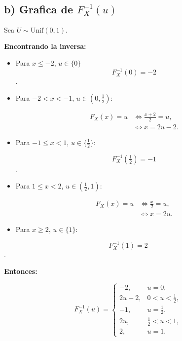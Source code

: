 \documentclass[10pt,a4paper]{article}
\begin{document}
    \begin{center}
    \end{center}
    { \hspace*{\fill} \\}
    
    \hypertarget{b-grafica-de-f_x-1u}{%
\subsection{\texorpdfstring{b) Grafica de
\(F_{X}^{-1}(u)\)}{b) Grafica de F\_\{X\}\^{}\{-1\}(u)}}\label{b-grafica-de-f_x-1u}}

    Sea \textbf{\(U\sim\mathrm{Unif}(0,1)\)}.

\textbf{Encontrando la inversa:}

\begin{itemize}
\item
  Para \(x\le -2\), \(u\in\{0\}\) \[
  F_X^{-1}(0)=-2
  \].
\item
  Para \(-2<x<-1\), \(u\in(0,\tfrac12)\):

  \[
  \begin{aligned}
  F_X(x)=u &\iff \frac{x+2}{2}=u,\\
           &\iff x=2u-2.
  \end{aligned}
  \]
\item
  Para \(-1\le x<1\), \(u\in\{\tfrac12\}\):

  \[
  F_X^{-1}(\tfrac12)=-1
  \].
\item
  Para \(1\le x<2\), \(u\in(\tfrac12,1)\):

  \[
  \begin{aligned}
  F_X(x)=u &\iff \frac{x}{2}=u,\\
           &\iff x=2u.
  \end{aligned}
  \]
\item
  Para \(x\ge 2\), \(u\in\{1\}\):
\end{itemize}

\[
F_X^{-1}(1)=2
\].

\textbf{Entonces:}

\[
F_X^{-1}(u)=
\begin{cases}
-2,& u=0,\\[4pt]
2u-2,& 0<u<\tfrac12,\\[4pt]
-1,& u=\tfrac12,\\[4pt]
2u,& \tfrac12<u<1,\\[4pt]
2,& u=1.
\end{cases}
\]
\end{document}
